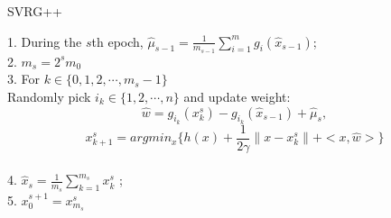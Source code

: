 \documentclass[11pt]{article} %
\begin{document}
\begin{algorithm} %
\caption{SVRG++} %
\label{SVRG++} %
1. During the $s$th epoch, $\hat{\mu}_{s-1}=\frac{1}{m_{s-1}}\sum_{i=1}^{m} g_i ({\hat{x}}_{s-1})$;\\
2. $m_s=2^s m_{0}$\\
3. For $k\in \{ 0,1, 2, \cdots, m_s -1\}$\\

 Randomly pick $i_k \in \{1,2,\cdots, n\}$ and update weight:
 $$ \hat{w}=g_{i_k}({x}_{k}^s)-g_{i_k}(\hat{x}_{s-1})+\hat{\mu}_s,$$
 $$x_{k+1}^s=argmin_{x}\{ h(x)+\frac{1}{2\gamma}\| x- x_k^s\|+<x,\hat{w}>\}$$\\

4. ${\hat x}_{s}=\frac{1}{m_s}\sum _{k=1}^{m_s}x_{k}^s$ ;\\
5. $x_0 ^{s+1}=x_{m_s}^s$
\end{algorithm}
\end{document}
